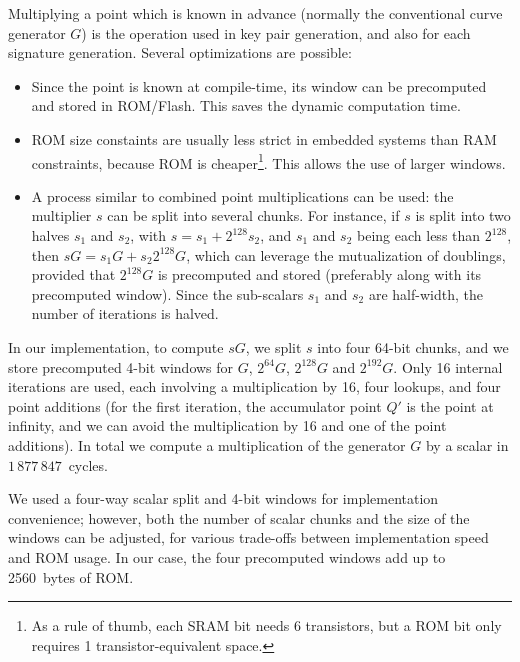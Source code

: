 \documentclass{llncs}
\begin{document}
Multiplying a point which is known in advance (normally the conventional
curve generator $G$) is the operation used in key pair generation, and
also for each signature generation. Several optimizations are possible:
\begin{itemize}

    \item Since the point is known at compile-time, its window can
    be precomputed and stored in ROM/Flash. This saves the dynamic
    computation time.

    \item ROM size constaints are usually less strict in embedded
    systems than RAM constraints, because ROM is cheaper\footnote{As a
    rule of thumb, each SRAM bit needs 6 transistors, but a ROM bit only
    requires 1 transistor-equivalent space.}. This allows the use of
    larger windows.

    \item A process similar to combined point multiplications can be
    used: the multiplier $s$ can be split into several chunks. For
    instance, if $s$ is split into two halves $s_1$ and $s_2$, with $s =
    s_1 + 2^{128} s_2$, and $s_1$ and $s_2$ being each less than
    $2^{128}$, then $sG = s_1 G + s_2 2^{128} G$, which can leverage the
    mutualization of doublings, provided that $2^{128} G$ is precomputed
    and stored (preferably along with its precomputed window). Since the
    sub-scalars $s_1$ and $s_2$ are half-width, the number of iterations
    is halved.

\end{itemize}

In our implementation, to compute $sG$, we split $s$ into four 64-bit
chunks, and we store precomputed 4-bit windows for $G$, $2^{64}G$,
$2^{128}G$ and $2^{192}G$. Only 16 internal iterations are used, each
involving a multiplication by 16, four lookups, and four point additions
(for the first iteration, the accumulator point $Q'$ is the point at
infinity, and we can avoid the multiplication by 16 and one of the point
additions). In total we compute a multiplication of the generator $G$ by
a scalar in $1\,877\,847$~cycles.

We used a four-way scalar split and 4-bit windows for implementation
convenience; however, both the number of scalar chunks and the size of
the windows can be adjusted, for various trade-offs between
implementation speed and ROM usage. In our case, the four precomputed
windows add up to 2560~bytes of ROM.
\end{document}
